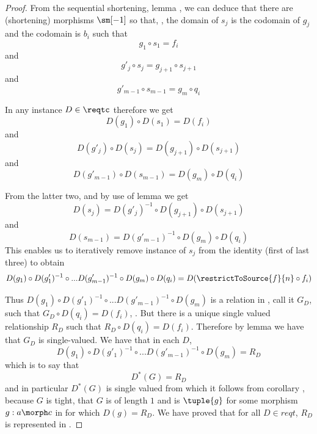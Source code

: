 \begin{proof}

From the 
sequential shortening, lemma ,
 we can deduce that there are
(shortening) morphisms $\sm[-1]$ so that, \foreachj[m-2],
the domain of  $s_j$ is the codomain of $g_j$ and 
the codomain  is $b_i$ such that 
\[
g_1 \circ s_1 = f_i
\]
and \foreachj[m-1]
\[
g'_j \circ s_j = g_{j+1} \circ s_{j+1}
\]
and
\[
g'_{m-1} \circ s_{m-1} = g_m \circ q_i
\] 

In any instance $D \in \reqtc$ therefore we get
\[
D(g_1) \circ D(s_1) = D(f_i)
\]
and \foreachj[m-2]
\[
D(g'_j) \circ D(s_j) = D(g_{j+1}) \circ D(s_{j+1})
\]
and
\[
D(g'_{m-1}) \circ D(s_{m-1}) = D(g_m) \circ D(q_i)
\]

From the latter two, and by use of  lemma  we get
\[
D(s_j) = D(g'_j)^{-1} \circ D(g_{j+1}) \circ D(s_{j+1})
\]
and
\[
 D(s_{m-1}) = D(g'_{m-1})^{-1} \circ D(g_m) \circ D(q_i)
\]
This enables us to iteratively remove instance of $s_j$ from the identity (first of last three)
to obtain 
\[
D(g_1) \circ D(g'_1)^{-1} \circ ... 
D(g'_{m-1})^{-1} \circ D(g_m)  \circ D(q_i)
= D(\restrictToSource{f}{n} \circ f_i)
\]

Thus $D(g_1) \circ D(g'_1)^{-1} \circ ... D(g'_{m-1})^{-1} \circ D(g_m)$
is a relation in \Rel , call it $G_D$, such that $G_D \circ D(q_i) = D(f_i)$, \foreachi. 
But there is a unique single valued relationship $R_D$
such that  $R_D \circ D(q_i) = D(f_i)$. 
Therefore by lemma  we have that $G_D$ is single-valued. We have that in each $D$,
\[
D(g_1) \circ D(g'_1)^{-1} \circ ... D(g'_{m-1})^{-1} \circ D(g_m) = R_D
\]
which is to say that
\[
D^*(G)=R_D
\]
and in particular $D^*(G)$ is single valued from which it follows from corollary  
, because $G$ is tight, that $G$ is of length $1$ and
is $\tuple{g}$ 
for some morphism $g:a \morph c$ in \catcw
for which $D(g)=R_D$. We have proved that 
for all $D \in reqt$, $R_D$ is represented in \catc. 

\end{proof}

